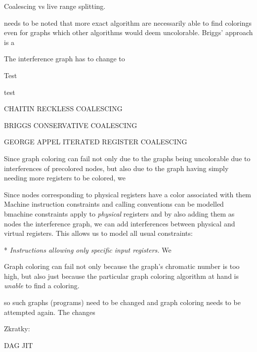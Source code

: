 Coalescing vs live range splitting.



%

needs to be noted that
more exact algorithm are necessarily able to find colorings even for graphs
which other algorithms would deem uncolorable. Briggs' approach is a 

The
interference graph has to change to 

\seccc Test

test




CHAITIN RECKLESS COALESCING

BRIGGS CONSERVATIVE COALESCING

GEORGE APPEL ITERATED REGISTER COALESCING



Since graph coloring can fail not only due to the graphs being uncolorable due
to interferences of precolored nodes, but also due to the graph having simply
needing more registers to be colored, we 

Since nodes corresponding to physical registers have a color associated with
them
Machine instruction constraints and calling conventions can be modelled bmachine constraints apply to {\em physical}
registers and by also adding them as nodes the interference graph, we can add
interferences between physical and virtual registers. This allows us to model
all usual constraints:

\begitems
* {\em Instructions allowing only specific input registers.} We 
\enditems

Graph coloring can fail not only because the graph's chromatic number is too
high, but also just because the particular graph coloring algorithm at hand is
{\em unable} to find a coloring.

so such
graphs (programs) need to be changed and graph coloring needs to be attempted
again. The changes






Zkratky:

DAG
JIT
